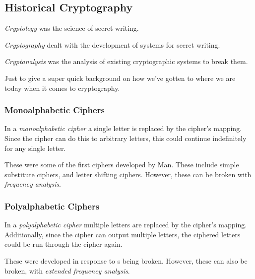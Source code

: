 \subsection{Historical Cryptography}\label{subsec:Historical_Cryptography}
\begin{definition}[Cryptology]\label{def:Cryptology}
  \emph{Cryptology} was the science of secret writing.
\end{definition}

\begin{definition}[Cryptography]\label{def:Cryptography}
  \emph{Cryptography} dealt with the development of systems for secret writing.
\end{definition}

\begin{definition}[Cryptanalysis]\label{def:Cryptanalysis}
  \emph{Cryptanalysis} was the analysis of existing cryptographic systems to break them.
\end{definition}

Just to give a super quick background on how we've gotten to where we are today when it comes to cryptography.

\subsubsection{Monoalphabetic Ciphers}\label{subsubsec:Monoalphabetic_Ciphers}
\begin{definition}\label{def:Monoalphabetic_Cipher}
  In a \emph{monoalphabetic cipher} a single letter is replaced by the cipher's mapping.
  Since the cipher can do this to arbitrary letters, this could continue indefinitely for any single letter.

  These were some of the first ciphers developed by Man.
  These include simple substitute ciphers, and letter shifting ciphers.
  However, these can be broken with \emph{frequency analysis}.
\end{definition}

\subsubsection{Polyalphabetic Ciphers}\label{subsubsec:Polyalphabetic_Ciphers}
\begin{definition}\label{def:Polyalphabetic_Cipher}
  In a \emph{polyalphabetic cipher} multiple letters are replaced by the cipher's mapping.
  Additionally, since the cipher can output multiple letters, the ciphered letters could be run through the cipher again.

  These were developed in response to s being broken.
  However, these can also be broken, with \emph{extended frequency analysis}.
\end{definition}

